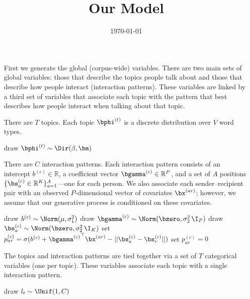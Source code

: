 \documentclass[10pt,english,oneside]{article}
\title{Our Model}
\author{}
\date{\today}
\begin{document}
First we generate the global (corpus-wide) variables. There are two
main sets of global variables: those that describe the topics people
talk about and those that describe how people interact (interaction
patterns). These variables are linked by a third set of variables that
associate each topic with the pattern that best describes how people
interact when talking about that topic.

There are $T$ topics. Each topic $\bphi^{(t)}$ is a discrete
distribution over $V$ word types.

\begin{algorithm}[h]
  \begin{algorithmic}[1]
    \State draw $\bphi^{(t)} \sim \Dir(\beta, \bm)$
    \EndFor
  \end{algorithmic}
\end{algorithm}

There are $C$ interaction patterns. Each interaction pattern consists
of an intercept $b^{(c)} \in \mathbb{R}$, a coefficient vector
$\bgamma^{(c)} \in \mathbb{R}^P$, and a set of $A$ positions $\{
\bs^{(c)}_a \in \mathbb{R}^K \}_{a=1}^A$---one for each person.  We
also associate each sender--recipient pair with an observed
$P$-dimensional vector of covariates $\bx^{(ar)}$; however, we assume
that our generative process is conditioned on these covariates.

\begin{algorithm}[h]
  \begin{algorithmic}[1]
    \State draw $b^{(c)} \sim \Norm(\mu, \sigma_1^2)$
    \State draw $\bgamma^{(c)} \sim \Norm(\bzero, \sigma_2^2 \, \I_P)$
    \State draw $\bs^{(c)}_a \sim \Norm(\bzero, \sigma_2^2\, \I_K)$
    \EndFor
    \State set $p^{(c)}_{ar} = \sigma(b^{(c)} + {\bgamma^{(c)}}^{\top}
    \bx^{(ar)} - ||\bs_{a}^{(c)} - \bs_{r}^{(c)}||)$
    \Else
    \State set $p^{(c)}_{ar} = 0$
    \EndIf
    \EndFor
    \EndFor
    \EndFor
  \end{algorithmic}
\end{algorithm}

The topics and interaction patterns are tied together via a set of $T$
categorical variables (one per topic). These variables associate each
topic with a single interaction pattern.

\begin{algorithm}[h]
  \begin{algorithmic}[1]
    \State draw $l_t \sim \Unif(1, C)$
    \EndFor
  \end{algorithmic}
\end{algorithm}
\end{document}
